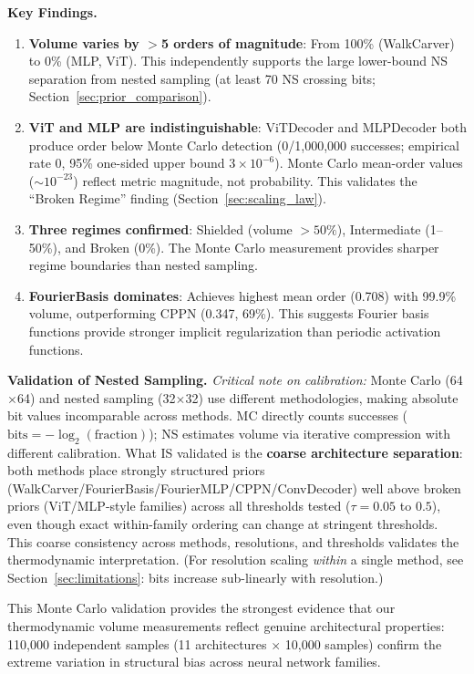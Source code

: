 \documentclass{article}
\begin{document}
\textbf{Key Findings.}
\begin{enumerate}
    \item \textbf{Volume varies by $>$5 orders of magnitude}: From 100\% (WalkCarver) to 0\% (MLP, ViT). This independently supports the large lower-bound NS separation from nested sampling (at least 70 NS crossing bits; Section~\ref{sec:prior_comparison}).

    \item \textbf{ViT and MLP are indistinguishable}: ViTDecoder and MLPDecoder both produce order below Monte Carlo detection (0/1,000,000 successes; empirical rate 0, 95\% one-sided upper bound $3\times 10^{-6}$). Monte Carlo mean-order values ($\sim 10^{-23}$) reflect metric magnitude, not probability. This validates the ``Broken Regime'' finding (Section~\ref{sec:scaling_law}).

    \item \textbf{Three regimes confirmed}: Shielded (volume $>50\%$), Intermediate (1--50\%), and Broken (0\%). The Monte Carlo measurement provides sharper regime boundaries than nested sampling.

    \item \textbf{FourierBasis dominates}: Achieves highest mean order (0.708) with 99.9\% volume, outperforming CPPN (0.347, 69\%). This suggests Fourier basis functions provide stronger implicit regularization than periodic activation functions.
\end{enumerate}

\textbf{Validation of Nested Sampling.} \emph{Critical note on calibration:} Monte Carlo (64$\times$64) and nested sampling (32$\times$32) use different methodologies, making absolute bit values incomparable across methods. MC directly counts successes ($\text{bits} = -\log_2(\text{fraction})$); NS estimates volume via iterative compression with different calibration. What IS validated is the \textbf{coarse architecture separation}: both methods place strongly structured priors (WalkCarver/FourierBasis/FourierMLP/CPPN/ConvDecoder) well above broken priors (ViT/MLP-style families) across all thresholds tested ($\tau = 0.05$ to $0.5$), even though exact within-family ordering can change at stringent thresholds. This coarse consistency across methods, resolutions, and thresholds validates the thermodynamic interpretation. (For resolution scaling \emph{within} a single method, see Section~\ref{sec:limitations}: bits increase sub-linearly with resolution.)

This Monte Carlo validation provides the strongest evidence that our thermodynamic volume measurements reflect genuine architectural properties: 110,000 independent samples (11 architectures $\times$ 10,000 samples) confirm the extreme variation in structural bias across neural network families.
\end{document}
